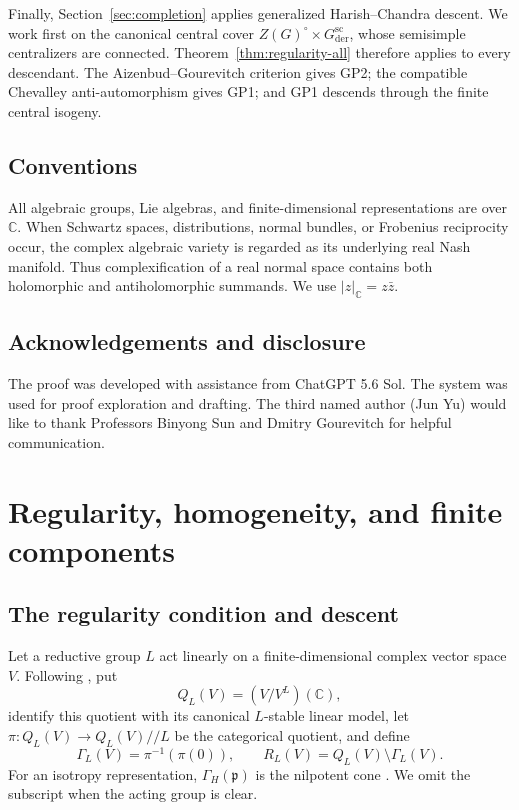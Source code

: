 \documentclass[11pt,reqno]{amsart}
\numberwithin{equation}{section}
\theoremstyle{definition}
\theoremstyle{remark}
\newcommand{\C}{\mathbb C}
\newcommand{\fp}{\mathfrak p}
\newcommand{\sslash}{/\!\!/}
\begin{document}
Finally, Section~\ref{sec:completion} applies generalized Harish--Chandra
descent.  We work first on the canonical central cover
$Z(G)^\circ\times G_{\mathrm{der}}^{\mathrm{sc}}$, whose semisimple
centralizers are connected.  Theorem~\ref{thm:regularity-all} therefore applies
to every descendant.  The Aizenbud--Gourevitch criterion gives GP2; the
compatible Chevalley anti-automorphism gives GP1; and GP1 descends through the
finite central isogeny.

\subsection{Conventions}

All algebraic groups, Lie algebras, and finite-dimensional representations are
over $\C$.  When Schwartz spaces, distributions, normal bundles, or Frobenius
reciprocity occur, the complex algebraic variety is regarded as its underlying
real Nash manifold.  Thus complexification of a real normal space contains
both holomorphic and antiholomorphic summands.  We use
$|z|_{\C}=z\bar z$.

\subsection{Acknowledgements and disclosure} The proof was developed with assistance from ChatGPT 5.6 Sol. 
The system was used for proof exploration and drafting. The third named author (Jun Yu) would like to thank 
Professors Binyong Sun and Dmitry Gourevitch for helpful communication.  


\section{Regularity, homogeneity, and finite components}\label{sec:framework}

\subsection{The regularity condition and descent}

Let a reductive group $L$ act linearly on a finite-dimensional complex vector
space $V$.  Following \cite[Notation~2.3.10]{AG09}, put
\[
  Q_L(V)=(V/V^L)(\C),
\]
identify this quotient with its canonical $L$-stable linear model, let
$\pi:Q_L(V)\to Q_L(V)\sslash L$ be the categorical quotient, and define
\[
  \Gamma_L(V)=\pi^{-1}(\pi(0)),\qquad
  R_L(V)=Q_L(V)\setminus\Gamma_L(V).
\]
For an isotropy representation, $\Gamma_H(\fp)$ is the nilpotent cone
\cite{KR,AG09}.  We omit the subscript when the acting group is clear.
\end{document}
